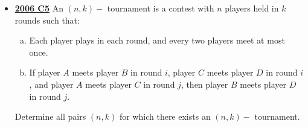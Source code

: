 \documentclass[11pt]{scrartcl}
\begin{document}
\begin{itemize}[leftmargin=*]
    \item \href{https://artofproblemsolving.com/community/c6h155699p875001}{\textbf{2006 C5}} An $ (n, k) -$ tournament is a contest with $ n$ players held in $ k$ rounds such that:
\begin{enumerate}[(a)]
    \item  Each player plays in each round, and every two players meet at most once.
    \item If player $ A$ meets player $ B$ in round $ i$, player $ C$ meets player $ D$ in round $ i$, and player $ A$ meets player $ C$ in round $ j$, then player $ B$ meets player $ D$ in round $ j$.
\end{enumerate}
Determine all pairs $ (n, k)$ for which there exists an $ (n, k) -$ tournament.
\end{itemize}
\newpage
\end{document}

